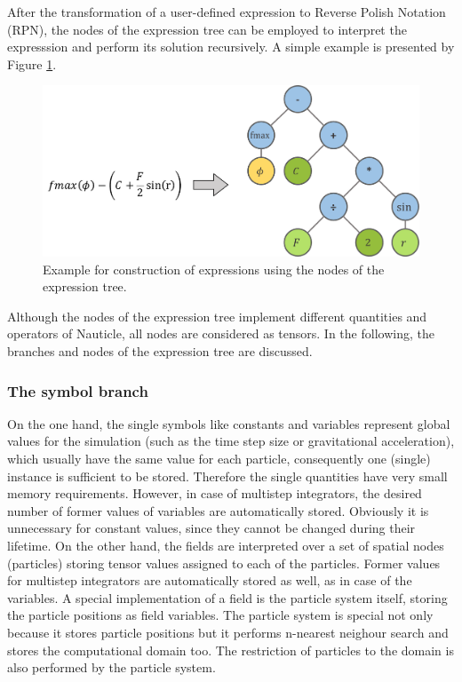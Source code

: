 \documentclass[a4paper,12pt,openany]{book}
\theoremstyle{break}
\begin{document}
After the transformation of a user-defined expression to Reverse Polish Notation (RPN), the nodes of the expression tree can be employed to interpret the expresssion and perform its solution recursively. A simple example is presented by Figure \ref{fig:expression_example}.
\begin{figure}[h]
  \includegraphics[scale=0.5]{expression_example.pdf}
  \centering
  \caption{Example for construction of expressions using the nodes of the expression tree.}
  \label{fig:expression_example}
\end{figure}\vspace*{3pt}

Although the nodes of the expression tree implement different quantities and operators of Nauticle, all nodes are considered as tensors. In the following, the branches and nodes of the expression tree are discussed.

\subsubsection{The symbol branch}
On the one hand, the single symbols like constants and variables represent global values for the simulation (such as the time step size or gravitational acceleration), which usually have the same value for each particle, consequently one (single) instance is sufficient to be stored. Therefore the single quantities have very small memory requirements. However, in case of multistep integrators, the desired number of former values of variables are automatically stored. Obviously it is unnecessary for constant values, since they cannot be changed during their lifetime. On the other hand, the fields are interpreted over a set of spatial nodes (particles) storing tensor values assigned to each of the particles. Former values for multistep integrators are automatically stored as well, as in case of the variables. A special implementation of a field is the particle system itself, storing the particle positions as field variables. The particle system is special not only because it stores particle positions but it performs n-nearest neighour search and stores the computational domain too. The restriction of particles to the domain is also performed by the particle system.
\end{document}

